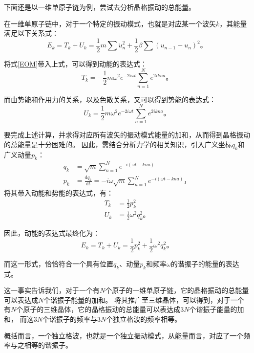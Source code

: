 \documentclass[declarePage]{ecnuthesis}
\begin{document}
下面还是以一维单原子链为例，尝试去分析晶格振动的总能量。%

在一维单原子链中，对于一个特定的振动模式，也就是对应某一个波矢$k$，其能量满足以下关系式：
\begin{equation}
    E_k=T_k+U_k=\frac{1}{2}m\sum\dot{u}_n^2+\frac{1}{2}\beta\sum(u_{n-1}-u_n)^2 \text{。}
\end{equation}

将式\ref{EOM}带入上式，可以得到动能的表达式：
\begin{equation}
    T_k=-\frac{1}{2}m\omega^2e^{-2i\omega t}\sum_{n=1}^{N}e^{2ikna} \text{。}
\end{equation}

而由势能和作用力的关系，以及色散关系，又可以得到势能的表达式：
\begin{equation}
    U_k=\frac{1}{2}m\omega^2e^{-2i\omega t}\sum_{n=1}^{N}e^{2ikna} \text{。}
\end{equation}

要完成上述计算，并求得对应所有波矢的振动模式能量的加和，从而得到晶格振动的总能量是十分困难的。%
因此，需结合分析力学的相关知识，引入广义坐标$q_k$和广义动量$p_k$：
\begin{align}
    q_k &= \sqrt{m}\sum_{n=1}^{N}e^{-i(\omega t-kna)} \\
    p_k &= \frac{\mathrm{d}q_k}{\mathrm{d}t} = -i\omega \sqrt{m}\sum_{n=1}^{N}e^{-i(\omega t-kna)} \text{，} 
\end{align}
将其带入动能和势能的表达式，有：
\begin{align}
    T_k &= \frac{1}{2}p_k^2 \\
    U_k &= \frac{1}{2}\omega^2q_k^2 \text{。} 
\end{align}

因此，动能的表达式最终化为：
\begin{equation}
    E_k=T_k+U_k=\frac{1}{2}p_k^2 + \frac{1}{2}\omega^2q_k^2 \text{。} 
\end{equation}

而这一形式，恰恰符合一个具有位置$q_k$、动量$p_k$和频率$\omega$的谐振子的能量的表达式。

这一事实告诉我们，对于一个有$N$个原子的一维单原子链，它的晶格振动的总能量可以表达成$N$个谐振子能量的加和。%
将其推广至三维晶体，可以得到，对于一个有$N$个原子的三维晶体，它的晶格振动的总能量可以表达成3$N$个谐振子能量的加和，%
而这3$N$个谐振子的频率与3$N$个独立格波的频率相等。

概括而言，一个独立格波，也就是一个独立振动模式，从能量而言，对应了一个频率与之相等的谐振子。
\end{document}
